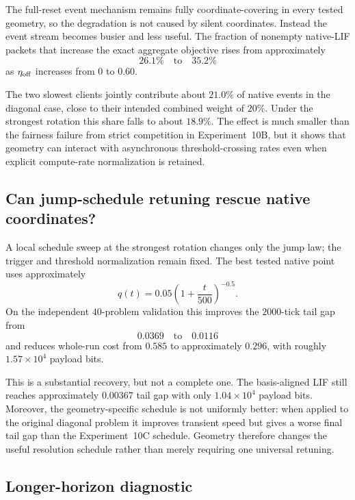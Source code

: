 The full-reset event mechanism remains fully coordinate-covering in every tested geometry, so the degradation is not caused by silent coordinates. Instead the event stream becomes busier and less useful. The fraction of nonempty native-LIF packets that increase the exact aggregate objective rises from approximately
\begin{equation}
  26.1\%\quad\text{to}\quad35.2\%
\end{equation}
as $\eta_{\rm off}$ increases from $0$ to $0.60$.

The two slowest clients jointly contribute about $21.0\%$ of native events in the diagonal case, close to their intended combined weight of $20\%$. Under the strongest rotation this share falls to about $18.9\%$. The effect is much smaller than the fairness failure from strict competition in Experiment~10B, but it shows that geometry can interact with asynchronous threshold-crossing rates even when explicit compute-rate normalization is retained.

\subsection{Can jump-schedule retuning rescue native coordinates?}

A local schedule sweep at the strongest rotation changes only the jump law; the trigger and threshold normalization remain fixed. The best tested native point uses approximately
\begin{equation}
  q(t)=0.05\left(1+\frac{t}{500}\right)^{-0.5}.
\end{equation}
On the independent $40$-problem validation this improves the $2000$-tick tail gap from
\begin{equation}
  0.0369\quad\text{to}\quad0.0116
\end{equation}
and reduces whole-run cost from $0.585$ to approximately $0.296$, with roughly $1.57\times10^4$ payload bits.

This is a substantial recovery, but not a complete one. The basis-aligned LIF still reaches approximately $0.00367$ tail gap with only $1.04\times10^4$ payload bits. Moreover, the geometry-specific schedule is not uniformly better: when applied to the original diagonal problem it improves transient speed but gives a worse final tail gap than the Experiment~10C schedule. Geometry therefore changes the useful resolution schedule rather than merely requiring one universal retuning.

\subsection{Longer-horizon diagnostic}

